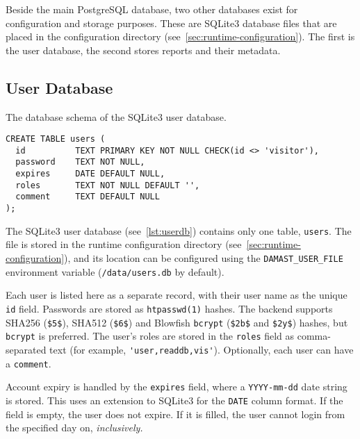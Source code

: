 Beside the main PostgreSQL database, two other databases exist for configuration and storage purposes.
These are SQLite3 database files that are placed in the configuration directory (see~\cref{sec:runtime-configuration}).
The first is the user database, the second stores reports and their metadata.


\subsection{User Database}
\label{sec:user-database}

\begin{lstfloat}
  \centering
  \caption{The database schema of the SQLite3 user database.}
  \label{lst:userdb}

  \begin{lstlisting}
CREATE TABLE users (
  id          TEXT PRIMARY KEY NOT NULL CHECK(id <> 'visitor'),
  password    TEXT NOT NULL,
  expires     DATE DEFAULT NULL,
  roles       TEXT NOT NULL DEFAULT '',
  comment     TEXT DEFAULT NULL
);
  \end{lstlisting}
\end{lstfloat}

The SQLite3 user database (see~\cref{lst:userdb}) contains only one table, \verb!users!.
The file is stored in the runtime configuration directory (see~\cref{sec:runtime-configuration}), and its location can be configured using the \verb!DAMAST_USER_FILE! environment variable (\verb!/data/users.db! by default).

Each user is listed here as a separate record, with their user name as the unique \verb!id! field.
Passwords are stored as \verb!htpasswd(1)! hashes.
The backend supports SHA256 (\verb!$5$!), SHA512 (\verb!$6$!) and Blowfish \verb!bcrypt! (\verb!$2b$! and \verb!$2y$!) hashes, but \verb!bcrypt! is preferred.
The user's roles are stored in the \verb!roles! field as comma-separated text (for example, \verb!'user,readdb,vis'!).
Optionally, each user can have a \verb!comment!.

Account expiry is handled by the \verb!expires! field, where a \verb!YYYY-mm-dd! date string is stored.
This uses an extension to SQLite3 for the \verb!DATE! column format.
If the field is empty, the user does not expire.
If it is filled, the user cannot login from the specified day on, \emph{inclusively.}


